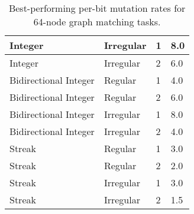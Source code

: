 \begin{table}[]
\begin{tabular}{l|l|l|l}
Integer               & Irregular                 & 1                      & 8.0                                                                                          \\\hline
Integer               & Irregular                 & 2                      & 6.0                                                                                          \\\hline
Bidirectional Integer & Regular                   & 1                      & 4.0                                                                                          \\\hline
Bidirectional Integer & Regular                   & 2                      & 6.0                                                                                          \\\hline
Bidirectional Integer & Irregular                 & 1                      & 8.0                                                                                          \\\hline
Bidirectional Integer & Irregular                 & 2                      & 4.0                                                                                          \\\hline
Streak                & Regular                   & 1                      & 3.0                                                                                          \\\hline
Streak                & Regular                   & 2                      & 2.0                                                                                          \\\hline
Streak                & Irregular                 & 1                      & 3.0                                                                                          \\\hline
Streak                & Irregular                 & 2                      & 1.5                                                                             \end{tabular}

\caption{
Best-performing per-bit mutation rates for 64-node graph matching tasks.
}
\label{tab:evo_graph_mut_big}


\end{table}
